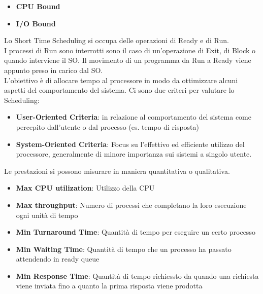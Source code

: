 \documentclass[12pt, a4paper]{article}
\begin{document}
	\begin{itemize}
		\item \textbf{CPU Bound}
		\item \textbf{I/O Bound}
	\end{itemize}

	Lo Short Time Scheduling si occupa delle operazioni di Ready e di Run. \\
	I processi di Run sono interrotti sono il caso di un'operazione di Exit, di Block o quando interviene il SO. Il movimento di un programma da Run a Ready viene appunto preso in carico dal SO.
	\\
	L'obiettivo è di allocare tempo al processore in modo da ottimizzare alcuni aspetti del comportamento del sistema. Ci sono due criteri per valutare lo Scheduling: 
	\begin{itemize}
		\item \textbf{User-Oriented Criteria}: in relazione al comportamento del sistema come percepito dall'utente o dal processo (es. tempo di risposta)
		\item \textbf{System-Oriented Criteria}: Focus su l'effettivo ed efficiente utilizzo del processore, generalmente di minore importanza sui sistemi a singolo utente.
	\end{itemize}
	
	Le prestazioni si possono misurare in maniera quantitativa o qualitativa.
	\begin{itemize}
		\item \textbf{Max CPU utilization}: Utilizzo della CPU
		\item \textbf{Max throughput}: Numero di processi che completano la loro esecuzione ogni unità di tempo
		\item \textbf{Min Turnaround Time}: Quantità di tempo per eseguire un certo processo
		\item \textbf{Min Waiting Time}: Quantità di tempo che un processo ha passato attendendo in ready queue
		\item \textbf{Min Response Time}: Quantità di tempo richiessto da quando una richiesta viene inviata fino a quanto la prima risposta viene prodotta
	\end{itemize}
		
\end{document}
